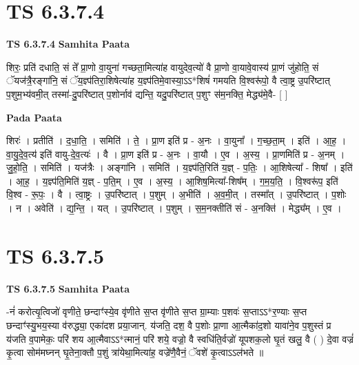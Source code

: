 \documentclass[17pt]{extarticle}
\begin{document}
\section*{ TS 6.3.7.4 }

\textbf{TS 6.3.7.4 } \newline
\textbf{Samhita Paata} \newline

शिरः॒ प्रति॑ दधाति॒ सं ते᳚ प्रा॒णो वा॒युना॑ गच्छता॒मित्या॑ह वायुदेव॒त्यो॑ वै प्रा॒णो वा॒यावे॒वास्य॑ प्रा॒णं जु॑होति॒ सं ॅयज॑त्रै॒रङ्गा॑नि॒ सं ॅय॒ज्ञ्प॑तिरा॒शिषेत्या॑ह य॒ज्ञ्प॑तिमे॒वास्या॒ऽऽ*शिषं॑ गमयति वि॒श्वरू॑पो॒ वै त्वा॒ष्ट्र उ॒परि॑ष्टात् प॒शुम॒भ्य॑वमी॒त् तस्मा॑-दु॒परि॑ष्टात् प॒शोर्नाव॑ द्यन्ति॒ यदु॒परि॑ष्टात् प॒शुꣳ स॑म॒नक्ति॒ मेद्ध्य॑मे॒वै- [  ] \newline

\textbf{Pada Paata} \newline

शिरः॑ । प्रतीति॑ । द॒धा॒ति॒ । समिति॑ । ते॒ । प्रा॒ण इति॑ प्र - अ॒नः । वा॒युना᳚ । ग॒च्छ॒ता॒म् । इति॑ । आ॒ह॒ । वा॒यु॒दे॒व॒त्य॑ इति॑ वायु-दे॒व॒त्यः॑ । वै । प्रा॒ण इति॑ प्र - अ॒नः । वा॒यौ । ए॒व । अ॒स्य॒ । प्रा॒णमिति॑ प्र - अ॒नम् । जु॒हो॒ति॒ । समिति॑ । यज॑त्रैः । अङ्गा॑नि । समिति॑ । य॒ज्ञ्प॑ति॒रिति॑ य॒ज्ञ् - प॒तिः॒ । आ॒शिषेत्या᳚ - शिषा᳚ । इति॑ । आ॒ह॒ । य॒ज्ञ्प॑ति॒मिति॑ य॒ज्ञ् - प॒ति॒म् । ए॒व । अ॒स्य॒ । आ॒शिष॒मित्या᳚-शिष᳚म् । ग॒म॒य॒ति॒ । वि॒श्वरू॑प॒ इति॑ वि॒श्व - रू॒पः॒ । वै । त्वा॒ष्ट्रः । उ॒परि॑ष्टात् । प॒शुम् । अ॒भीति॑ । अ॒व॒मी॒त् । तस्मा᳚त् । उ॒परि॑ष्टात् । प॒शोः । न । अवेति॑ । द्य॒न्ति॒ । यत् । उ॒परि॑ष्टात् । प॒शुम् । स॒म॒नक्तीति॑ सं - अ॒नक्ति॑ । मेद्ध्य᳚म् । ए॒व ।  \newline




\section*{ TS 6.3.7.5 }

\textbf{TS 6.3.7.5 } \newline
\textbf{Samhita Paata} \newline

-नं॑ करोत्यृ॒त्विजो॑ वृणीते॒ छन्दाꣳ॑स्ये॒व वृ॑णीते स॒प्त वृ॑णीते स॒प्त ग्रा॒म्याः प॒शवः॑ स॒प्ताऽऽ*र॒ण्याः स॒प्त छन्दाꣳ॑स्यु॒भय॒स्या व॑रुद्ध्या॒ एका॑दश प्रया॒जान्. य॑जति॒ दश॒ वै प॒शोः प्रा॒णा आ॒त्मैका॑द॒शो यावा॑ने॒व प॒शुस्तं प्र य॑जति व॒पामेकः॒ परि॑ शय आ॒त्मैवाऽऽ*त्मानं॒ परि॑ शये॒ वज्रो॒ वै स्वधि॑ति॒र्वज्रो॑ यूपशक॒लो घृ॒तं खलु॒ वै ( )  दे॒वा वज्रं॑ कृ॒त्वा सोम॑मघ्नन् घृ॒तेना॒क्तौ प॒शुं त्रा॑येथा॒मित्या॑ह॒ वज्रे॑णै॒वैनं॒ ॅवशे॑ कृ॒त्वाऽऽल॑भते ॥ \newline
\end{document}
